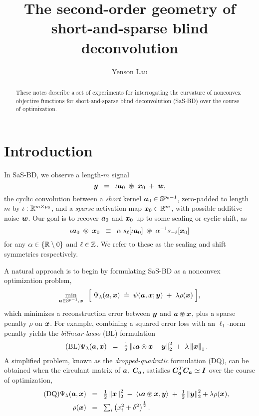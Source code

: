 \documentclass{article}
\title{The second-order geometry of \\ short-and-sparse blind deconvolution}
\author{Yenson Lau}
\numberwithin{equation}{section}
\begin{document}
\maketitle

\begin{abstract}
  These notes describe a set of experiments for interrogating the curvature of nonconvex objective functions for short-and-sparse blind deconvolution (SaS-BD) over the course of optimization.
\end{abstract}

\section{Introduction}
In SaS-BD, we observe a length-$m$ signal
\begin{equation*}
  \boldsymbol{y} \;\;=\;\; \iota\boldsymbol{a}_0 \;\circledast\; \boldsymbol{x}_0 \;+\; \boldsymbol{w},
\end{equation*}
the cyclic convolution between a {\em short} kernel $\boldsymbol{a}_0\in\mathbb{S}^{p_0-1}$, zero-padded to length $m$ by $\iota:\mathbb{R}^{m\times p_0}$, and a {\em sparse} activation map $\boldsymbol{x}_0\in\mathbb{R}^m$, with possible additive noise $\boldsymbol{w}$. Our goal is to recover $\boldsymbol{a}_0$ and $\boldsymbol{x}_0$ up to some scaling or cyclic shift, as
\begin{equation*}
  \iota\boldsymbol{a}_0 \;\circledast\; \boldsymbol{x}_0 \;\;\equiv\;\;
  \alpha\;s_\ell[\iota\boldsymbol{a}_0] \;\circledast\; \alpha^{-1} s_{-\ell}[\boldsymbol{x}_0]
\end{equation*}
for any $\alpha\in\left\{ \mathbb{R}\setminus0\right\}$ and $\ell\in\mathbb{Z}$. We refer to these as the scaling and shift symmetries respectively.

A natural approach is to begin by formulating SaS-BD as a nonconvex optimization problem,
\begin{equation} \label{eqn:obj-Psi}
  \min_{\boldsymbol{a} \in \mathbb{S}^{p-1}, \boldsymbol{x}} \;\;\Big[\;
    \Psi_\lambda(\boldsymbol{a}, \boldsymbol{x}) \;\doteq\; \psi(\boldsymbol{a}, \boldsymbol{x} ; \boldsymbol{y})
    \;+\; \lambda\rho(\boldsymbol{x})
  \;\Big],
\end{equation}
which minimizes a reconstruction error between $\boldsymbol{y}$ and $\boldsymbol{a}\circledast\boldsymbol{x}$, plus a sparse penalty $\rho$ on $\boldsymbol{x}$. For example, combining a squared error loss with an $\ell_1$-norm penalty yields the {\em bilinear-lasso} (BL) formulation
\begin{equation} \tag{BL} \label{eqn:bl}
  \Psi_\lambda(\boldsymbol{a},\boldsymbol{x}) \;\;=\;\; \tfrac12\left\lVert \iota\boldsymbol{a}\circledast\boldsymbol{x}-\boldsymbol{y}\right\rVert_2^2 \;+\; \lambda\left\lVert \boldsymbol{x}\right\rVert_1.
\end{equation}
A simplified problem, known as the {\em dropped-quadratic} formulation (DQ), can be obtained when the circulant matrix of $\boldsymbol{a}$, $\boldsymbol{C}_{\boldsymbol{a}}$, satisfies $\boldsymbol{C}_{\boldsymbol{a}}^T\boldsymbol{C}_{\boldsymbol{a}} \simeq \boldsymbol{I}$ over the course of optimization,
\begin{align} \tag{DQ} \label{eqn:dq}
  \Psi_\lambda(\boldsymbol{a},\boldsymbol{x}) \;\;&=\;\; \tfrac12\left\lVert \boldsymbol{x}\right\rVert_2^2 \;-\; \left\langle \iota\boldsymbol{a}\circledast \boldsymbol{x}, \boldsymbol{y}\right\rangle \;+\; \tfrac12\left\lVert \boldsymbol{y}\right\rVert_2^2+\lambda\rho(\boldsymbol{x}), \\
  \rho(\boldsymbol{x}) \;\;&=\;\; \textstyle \sum_i \left( x_i^2+\delta^2\right)^{\frac12}.
\end{align}
\end{document}
